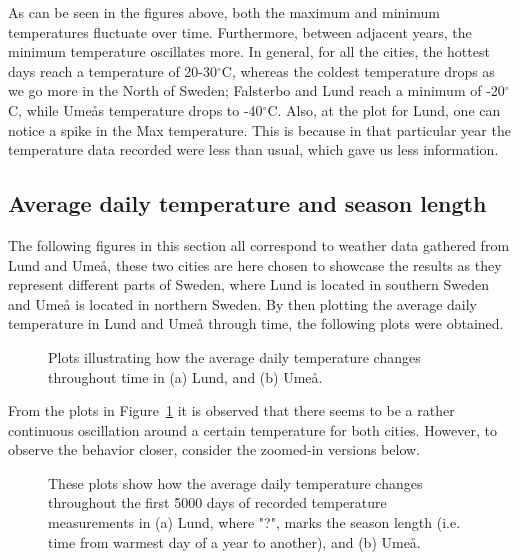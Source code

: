 As can be seen in the figures above, both the maximum and minimum temperatures fluctuate over time. Furthermore, between adjacent years, the minimum temperature oscillates more. In general, for all the cities, the hottest days reach a temperature of 20-30$^{\circ}$C, whereas the coldest temperature drops as we go more in the North of Sweden; Falsterbo and Lund reach a minimum of -20$^{\circ}$C, while Umeås temperature drops to -40$^{\circ}$C.
\newline
\newline
Also, at the plot for Lund, one can notice a spike in the Max temperature. This is because in that particular year the temperature data recorded were less than usual, which gave us less information.



\subsection{Average daily temperature and season length}
The following figures in this section all correspond to weather data gathered from Lund and Umeå, these two cities are here chosen to showcase the results as they represent different parts of Sweden, where Lund is located in southern Sweden and Umeå is located in northern Sweden. By then plotting the average daily temperature in Lund and Umeå through time, the following plots were obtained.
\begin{figure}[H]
    \centering
    \quad
    \caption{Plots illustrating how the average daily temperature changes throughout time in (a) Lund, and (b) Umeå.}
    \label{fig:Daily_temp}
\end{figure}
From the plots in Figure~\ref{fig:Daily_temp} it is observed that there seems to be a rather continuous oscillation around a certain temperature for both cities. However, to observe the behavior closer, consider the zoomed-in versions below.
\begin{figure}[H]
    \centering
    \quad
    \caption{These plots show how the average daily temperature changes throughout the first 5000 days of recorded temperature measurements in (a) Lund, where "?", marks the season length (i.e. time from warmest day of a year to another), and (b) Umeå.}
    \label{fig:Daily_temp_zoomed}
\end{figure}
